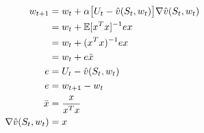 \begin{equation}
\begin{split}
w_{t+1} & = w_t + \alpha \big[ U_t - \hat{v}(S_t, w_t)\big]\nabla \hat{v}(S_t, w_t) \\
& = w_t +  \operatorname{\mathbb{E}}[x^Tx]^{-1}  e x \\
& = w_t +  (x^Tx)^{-1} ex \\
& = w_t +  e\bar{x} \\
e & =  U_t - \hat{v}(S_t, w_t) \\
e & = w_{t+1} - w_{t} \\
\bar{x} & = \frac{x}{x^Tx} \\
\nabla \hat{v}(S_t, w_t) & = x
\end{split}
\end{equation}